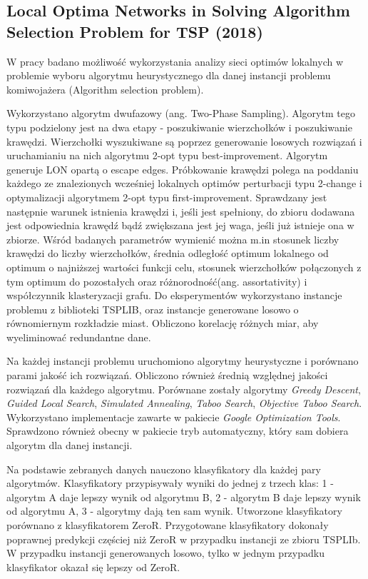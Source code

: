\subsection*{Local Optima Networks in Solving Algorithm Selection Problem for TSP (2018) \cite{DBLP:conf/depcos/BozejkoGNAB18}}
W pracy badano możliwość wykorzystania analizy sieci optimów lokalnych w problemie wyboru algorytmu heurystycznego dla danej instancji problemu komiwojażera
(Algorithm selection problem).

Wykorzystano algorytm dwufazowy (ang. Two-Phase Sampling).
Algorytm tego typu podzielony jest na dwa etapy - poszukiwanie wierzchołków i poszukiwanie krawędzi.
Wierzchołki wyszukiwane są poprzez generowanie losowych rozwiązań i uruchamianiu na nich algorytmu 2-opt typu best-improvement.
Algorytm generuje LON opartą o escape edges.
Próbkowanie krawędzi polega na poddaniu każdego ze znalezionych wcześniej lokalnych optimów perturbacji typu 2-change i
optymalizacji algorytmem 2-opt typu first-improvement.
Sprawdzany jest następnie warunek istnienia krawędzi i, jeśli jest spełniony, do zbioru dodawana jest odpowiednia krawędź
bądź zwiększana jest jej waga, jeśli już istnieje ona w zbiorze.
Wśród badanych parametrów wymienić można m.in stosunek liczby krawędzi do liczby wierzchołków,
średnia odległość optimum lokalnego od optimum o najniższej wartości funkcji celu,
stosunek wierzchołków połączonych z tym optimum do pozostałych oraz różnorodność(ang. assortativity) i współczynnik klasteryzacji grafu.
Do eksperymentów wykorzystano instancje problemu z biblioteki TSPLIB, oraz instancje generowane losowo o równomiernym rozkładzie miast.
Obliczono korelację różnych miar, aby wyeliminować redundantne dane.

Na każdej instancji problemu uruchomiono algorytmy heurystyczne i porównano parami jakość ich rozwiązań.
Obliczono również średnią względnej jakości rozwiązań dla każdego algorytmu.
Porównane zostały algorytmy \textit{Greedy Descent}, \textit{Guided Local Search}, \textit{Simulated Annealing}, \textit{Taboo Search}, \textit{Objective Taboo Search}.
Wykorzystano implementacje zawarte w pakiecie \textit{Google Optimization Tools}. Sprawdzono również obecny w pakiecie tryb automatyczny, który sam dobiera
algorytm dla danej instancji.

Na podstawie zebranych danych nauczono klasyfikatory dla każdej pary algorytmów.
Klasyfikatory przypisywały wyniki do jednej z trzech klas: 1 - algorytm A daje lepszy wynik od algorytmu B,
2 - algorytm B daje lepszy wynik od algorytmu A, 3 - algorytmy dają ten sam wynik.
Utworzone klasyfikatory porównano z klasyfikatorem ZeroR.
Przygotowane klasyfikatory dokonały poprawnej predykcji częściej niż ZeroR w przypadku instancji ze
zbioru TSPLIb. W przypadku instancji generowanych losowo, tylko w jednym przypadku klasyfikator
okazał się lepszy od ZeroR.

